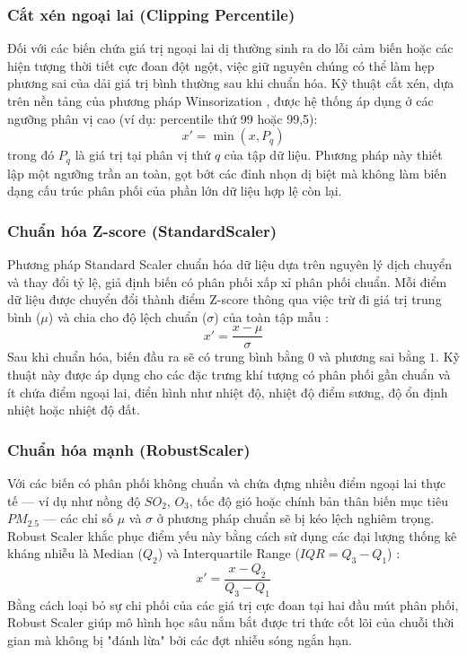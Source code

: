 \subsubsection{Cắt xén ngoại lai (Clipping Percentile)}
Đối với các biến chứa giá trị ngoại lai dị thường sinh ra do lỗi cảm biến hoặc các hiện tượng thời tiết cực đoan đột ngột, việc giữ nguyên chúng có thể làm hẹp phương sai của dải giá trị bình thường sau khi chuẩn hóa. Kỹ thuật cắt xén, dựa trên nền tảng của phương pháp Winsorization \cite{hastings1947low}, được hệ thống áp dụng ở các ngưỡng phân vị cao (ví dụ: percentile thứ 99 hoặc 99,5):
$$x' = \min(x, P_q)$$
trong đó $P_q$ là giá trị tại phân vị thứ $q$ của tập dữ liệu. Phương pháp này thiết lập một ngưỡng trần an toàn, gọt bớt các đỉnh nhọn dị biệt mà không làm biến dạng cấu trúc phân phối của phần lớn dữ liệu hợp lệ còn lại.

\subsubsection{Chuẩn hóa Z-score (StandardScaler)}
Phương pháp Standard Scaler chuẩn hóa dữ liệu dựa trên nguyên lý dịch chuyển và thay đổi tỷ lệ, giả định biến có phân phối xấp xỉ phân phối chuẩn. Mỗi điểm dữ liệu được chuyển đổi thành điểm Z-score thông qua việc trừ đi giá trị trung bình ($\mu$) và chia cho độ lệch chuẩn ($\sigma$) của toàn tập mẫu \cite{han2011data, lecun1998efficient}:
$$x' = \frac{x - \mu}{\sigma}$$
Sau khi chuẩn hóa, biến đầu ra sẽ có trung bình bằng $0$ và phương sai bằng $1$. Kỹ thuật này được áp dụng cho các đặc trưng khí tượng có phân phối gần chuẩn và ít chứa điểm ngoại lai, điển hình như nhiệt độ, nhiệt độ điểm sương, độ ổn định nhiệt hoặc nhiệt độ đất.

\subsubsection{Chuẩn hóa mạnh (RobustScaler)}
Với các biến có phân phối không chuẩn và chứa đựng nhiều điểm ngoại lai thực tế — ví dụ như nồng độ $SO_2$, $O_3$, tốc độ gió hoặc chính bản thân biến mục tiêu $PM_{2.5}$ — các chỉ số $\mu$ và $\sigma$ ở phương pháp chuẩn sẽ bị kéo lệch nghiêm trọng. Robust Scaler khắc phục điểm yếu này bằng cách sử dụng các đại lượng thống kê kháng nhiễu là Median ($Q_2$) và Interquartile Range ($IQR = Q_3 - Q_1$) \cite{rousseeuw1993robust}:
$$x' = \frac{x - Q_2}{Q_3 - Q_1}$$
Bằng cách loại bỏ sự chi phối của các giá trị cực đoan tại hai đầu mút phân phối, Robust Scaler giúp mô hình học sâu nắm bắt được tri thức cốt lõi của chuỗi thời gian mà không bị "đánh lừa" bởi các đợt nhiễu sóng ngắn hạn.

